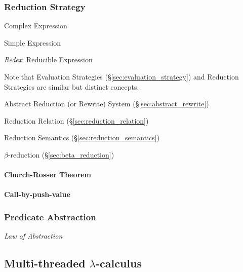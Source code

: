 \subsubsection{Reduction Strategy}\label{sec:reduction_strategy}

Complex Expression

Simple Expression

\emph{Redex}: Reducible Expression

\fist Note that Evaluation Strategies
(\S\ref{sec:evaluation_strategy}) and Reduction Strategies are similar
but distinct concepts.

Abstract Reduction (or Rewrite) System (\S\ref{sec:abstract_rewrite})

Reduction Relation (\S\ref{sec:reduction_relation})

Reduction Semantics (\S\ref{sec:reduction_semantics})

$\beta$-reduction (\S\ref{sec:beta_reduction})



\paragraph{Church-Rosser Theorem}\label{sec:church_rosser}\hfill

\paragraph{Call-by-push-value}\label{sec:call_by_pushvalue}\hfill



\subsubsection{Predicate Abstraction}\label{sec:predicate_abstraction}

\emph{Law of Abstraction}



\subsection{Multi-threaded $\lambda$-calculus}\label{sec:mtlc}

\begingroup

\newcommand{\chpos}{\mathbf{chpos}}
\newcommand{\chneg}{\mathbf{chneg}}
\newcommand{\channelsend}{\mono{channel\_send}}
\newcommand{\chanpossend}{\mono{chanpos\_send}}
\newcommand{\channegsend}{\mono{channeg\_send}}
\newcommand{\channelrecv}{\mono{channel\_recv}}
\newcommand{\chanposrecv}{\mono{chanpos\_recv}}
\newcommand{\channegrecv}{\mono{channeg\_recv}}
\newcommand{\channelclose}{\mono{channel\_close}}
\newcommand{\chanposclose}{\mono{chanpos\_close}}
\newcommand{\channegclose}{\mono{channeg\_close}}
\newcommand{\Send}{\mathsf{Send}}
\newcommand{\Recv}{\mathsf{Recv}}
\renewcommand{\Unit}{\mathsf{\mathbf{1}}}

